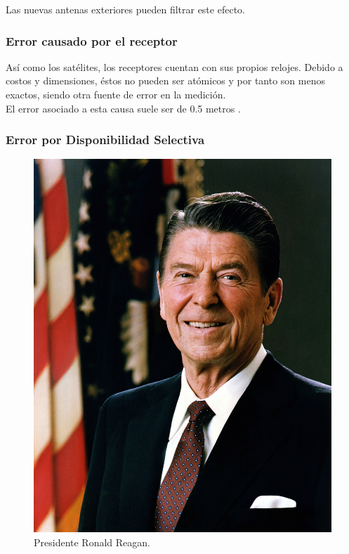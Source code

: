 Las nuevas antenas exteriores pueden filtrar este efecto.

\subsubsection{Error causado por el receptor}

Así como los satélites, los receptores cuentan con sus propios relojes. Debido a costos y dimensiones, éstos no pueden ser atómicos y por tanto son menos exactos, siendo otra fuente de error en la medición.\\

El error asociado a esta causa suele ser de 0.5 metros \cite{fallas2002sistema}.

\subsubsection{Error por Disponibilidad Selectiva}

\begin{figure}[!ht]
\centering
\includegraphics[scale=0.30]{Figures/RonaldReagan}
\caption[Presidente Ronald Reagan.]{Presidente Ronald Reagan.}
\label{fig:ErrDis}
\end{figure}

